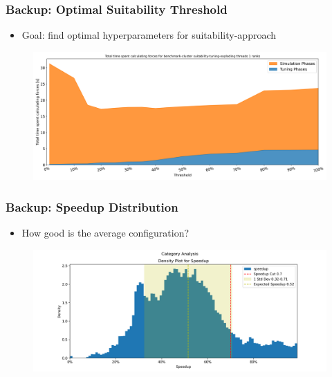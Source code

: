 \documentclass[
	10pt,
	t		%
]{beamer}
\begin{document}
\begin{frame}
	\frametitle{Backup: Optimal Suitability Threshold}
	
	\begin{itemize}
		\item Goal: find optimal hyperparameters for suitability-approach
	\end{itemize}
	
	\begin{figure}
		\centering
		\includegraphics[width=1\textwidth]{figures/suitability-search.png}
	\end{figure}
\end{frame}



\begin{frame}
	\frametitle{Backup: Speedup Distribution}
	
	\begin{itemize}
		\item How good is the average configuration?
	\end{itemize}
	
	\begin{figure}
		\centering
		\includegraphics[width=1\textwidth]{figures/speedup.png}
	\end{figure}
\end{frame}
\end{document}
